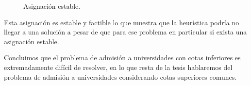 \begin{eje}
\begin{figure}[H]

\caption{Asignación estable.}
\end{figure}

Esta asignación es estable y factible lo que muestra que la heurística podría no llegar a una solución a pesar de que para ese problema en particular si exista una asignación estable. \fin

\end{eje}

Concluimos que el problema de admisión a universidades con cotas inferiores es extremadamente difícil de resolver, en lo que resta de la tesis hablaremos del problema de admisión a universidades considerando cotas superiores comunes. 




